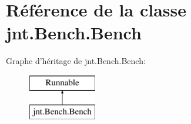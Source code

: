 \hypertarget{classjnt_1_1Bench_1_1Bench}{\section{Référence de la classe jnt.\-Bench.\-Bench}
\label{classjnt_1_1Bench_1_1Bench}
}
Graphe d'héritage de jnt.\-Bench.\-Bench\-:\begin{figure}[H]
\begin{center}
\leavevmode
\includegraphics[height=2.000000cm]{d1/d59/classjnt_1_1Bench_1_1Bench}
\end{center}
\end{figure}
